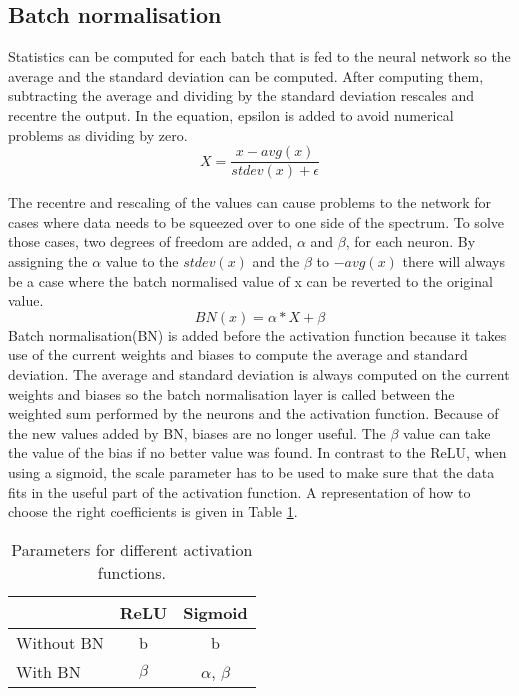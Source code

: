 \subsection{Batch normalisation}

Statistics can be computed for each batch that is fed to the neural network so the average and the standard deviation can be computed. After computing them, subtracting the average and dividing by the standard deviation rescales and recentre the output. 
In the equation, epsilon is added to avoid numerical problems as dividing by zero.
\begin{equation}
X= \dfrac{x - avg(x)}{stdev(x) + \epsilon} 
\end{equation}

The recentre and rescaling of the values can cause problems to the network for cases where data needs to be squeezed over to one side of the spectrum.
To solve those cases, two degrees of freedom are added, $\alpha$ and $\beta$, for each neuron. 
By assigning the $\alpha$ value to the $stdev(x)$ and the $\beta$ to $-avg(x)$ there will always be a case where the batch normalised value of x can be reverted to the original value.
\begin{equation}
BN(x) = \alpha * X + \beta
\end{equation}
Batch normalisation(BN) is added before the activation function because it takes use of the current weights and biases to compute the average and standard deviation. 
The average and standard deviation is always computed on the current weights and biases so the batch normalisation layer is called between the weighted sum performed by the neurons and the activation function.
Because of the new values added by BN, biases are no longer useful.
The $\beta$ value can take the value of the bias if no better value was found.
In contrast to the ReLU, when using a sigmoid, the scale parameter has to be used to make sure that the data fits in the useful part of the activation function. A representation of how to choose the right coefficients is given in Table \ref{tab:Parameters}.


\begin{table}[htbp]
\centering
\begin{tabular}{lcc}
\toprule
  & ReLU & Sigmoid \\\midrule
Without BN &b & b  \\
With BN & $\beta$ & $\alpha$, $\beta$  \\
\bottomrule
\end{tabular}
\caption{Parameters for different activation functions.}
\label{tab:Parameters}
\end{table}

